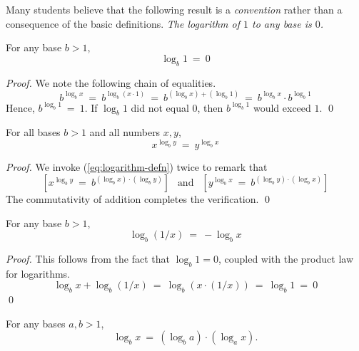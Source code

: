Many students believe that the following result is a {\em convention}
rather than a consequence of the basic definitions.  {\em The logarithm
  of $1$ to any base is $0$.}

\begin{prop}
For any base $b >1$,
\[ \log_b 1 \ = \ 0 \]
\end{prop}

\begin{proof}
We note the following chain of equalities.
\[  b^{\log_b x} \ = \ b^{\log_b (x \cdot 1)} 
\ = \ b^{(\log_b x) + (\log_b 1)} 
\ = \ b^{\log_b x} \cdot b^{\log_b 1}
\]
Hence, $b^{\log_b 1} \ = \ 1$.  If $\log_b 1$ did not equal $0$, then
$b^{\log_b 1}$ would exceed $1$.  \qed
\end{proof}

\begin{prop}
For all bases $b > 1$ and all numbers $x, y$,
\[ x^{\log_b y} \ = \ y^{\log_b x} \]
\end{prop}

\begin{proof}
We invoke (\ref{eq:logarithm-defn}) twice to remark that
\[ \left[x^{\log_b y} \ = \ b^{(\log_b x) \cdot (\log_b y)}\right]
\ \ \mbox{ and } \ \ 
\left[y^{\log_b x}\ = \ b^{(\log_b y) \cdot (\log_b x)}\right] \]
The commutativity of addition completes the verification.  \qed
\end{proof}

\begin{prop}
For any base $b >1$,
\[ \log_b (1/x) \ = \ - \log_b x \]
\end{prop}

\begin{proof}
This follows from the fact that $\log_b 1 =0$, coupled with the
product law for logarithms.
\[ \log_b x + \log_b (1/x) \ = \ \log_b (x \cdot (1/x))
\  = \ \log_b 1 \ = \ 0 
\]
\qed
\end{proof}

\begin{prop}
For any bases $a, b >1$,
\begin{equation}
\label{eq:log-exp-0}
\log_b x \ = \ \left(\log_b a \right) \cdot \left( \log_a x \right).
\end{equation}
\end{prop}

